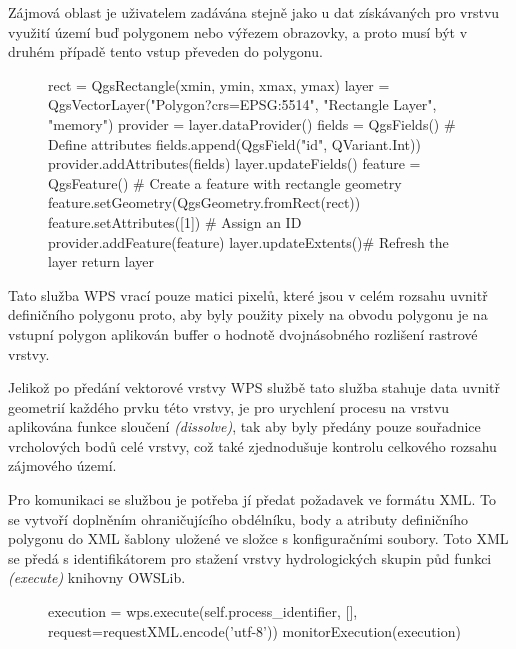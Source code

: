 \documentclass[a4paper,oneside,12pt]{book}
\begin{document}
 \hspace{10mm}Zájmová oblast je uživatelem zadávána stejně jako u dat získávaných pro vrstvu využití území buď polygonem nebo výřezem obrazovky, a proto musí být v druhém případě tento vstup převeden do polygonu.
 
 \begin{figure}[H]
\begin{pythoncode}[style=mypython, caption={Převod výřezu obrazovky na polygon},label={kod:extenttoplg}]
rect = QgsRectangle(xmin, ymin, xmax, ymax)
layer = QgsVectorLayer("Polygon?crs=EPSG:5514", "Rectangle Layer", "memory")
provider = layer.dataProvider()
fields = QgsFields() # Define attributes
fields.append(QgsField("id", QVariant.Int))
provider.addAttributes(fields)
layer.updateFields()
feature = QgsFeature() # Create a feature with rectangle geometry
feature.setGeometry(QgsGeometry.fromRect(rect))
feature.setAttributes([1])  # Assign an ID
provider.addFeature(feature)
layer.updateExtents()# Refresh the layer
return layer
\end{pythoncode}
\end{figure}

 \hspace{10mm}Tato služba WPS vrací pouze matici pixelů, které jsou v celém rozsahu uvnitř definičního polygonu proto, aby byly použity pixely na obvodu polygonu je na vstupní polygon aplikován buffer o hodnotě dvojnásobného rozlišení rastrové vrstvy. 

 \hspace{10mm} Jelikož po předání vektorové vrstvy WPS službě tato služba stahuje data uvnitř geometrií každého prvku této vrstvy, je pro urychlení procesu na vrstvu aplikována funkce sloučení \textit{(dissolve)}, tak aby byly předány pouze souřadnice vrcholových bodů celé vrstvy, což také zjednodušuje kontrolu celkového rozsahu zájmového území.

  \hspace{10mm} Pro komunikaci se službou je potřeba jí předat požadavek ve formátu XML. To se vytvoří doplněním ohraničujícího obdélníku, body a atributy definičního polygonu do XML šablony uložené ve složce s konfiguračními soubory. Toto XML se předá s identifikátorem pro stažení vrstvy hydrologických skupin půd funkci \textit{(execute)} knihovny OWSLib.

\begin{figure}[H]
\begin{pythoncode}[style=mypython, caption={Spuštění komunikace s WPS službou},label={kod:wps}]
execution = wps.execute(self.process_identifier, [], request=requestXML.encode('utf-8'))
monitorExecution(execution)
\end{pythoncode}
\end{figure}
\end{document}
